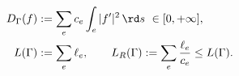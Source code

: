 \begin{equation}
\label{eq:ch28-dirichlet-form}
\begin{aligned}
 D_\Gamma(f)&:=\sum_e c_e\int_e|f'|^2\,\rd s\ \in[0,+\infty],\\
 L(\Gamma)&:=\sum_e\ell_e,
 \qquad L_R(\Gamma):=\sum_e\frac{\ell_e}{c_e}\leq L(\Gamma).
\end{aligned}
\end{equation}
